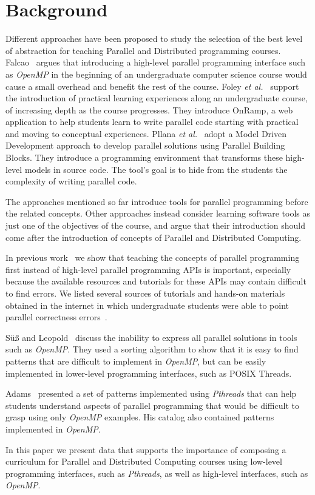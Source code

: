 \section{Background}
\label{sec:background}

Different approaches have been proposed to study the selection of the best
level of abstraction for teaching Parallel and Distributed programming courses.
Falcao~\cite{6565518} argues that introducing a high-level parallel programming
interface such as \textit{OpenMP} in the beginning of an undergraduate computer
science course would cause a small overhead and benefit the rest of the course.
Foley \textit{et al.}~\cite{FOLEY2017138} support the introduction of practical
learning experiences along an undergraduate course, of increasing depth as the
course progresses. They introduce OnRamp, a web application to help students
learn to write parallel code starting with practical and moving to conceptual
experiences.  Pllana \textit{et al.}~\cite{Pllana:2009} adopt a Model Driven
Development approach to develop parallel solutions using Parallel Building
Blocks. They introduce a programming environment that transforms these
high-level models in source code. The tool's goal is to hide from the students
the complexity of writing parallel code.

The approaches mentioned so far introduce tools for parallel programming before
the related concepts.  Other approaches instead consider learning software
tools as just one of the objectives of the course, and argue that their
introduction should come after the introduction of concepts of Parallel and
Distributed Computing.

In previous work~\cite{goncalves:OpenMPNotEasy} we show that teaching the
concepts of parallel programming first instead of high-level parallel
programming APIs is important, especially because the available resources and
tutorials for these APIs may contain difficult to find errors.  We listed
several sources of tutorials and hands-on materials obtained in the internet in
which undergraduate students were able to point parallel correctness
errors~\cite{SuB:2005:CMO:1892830.1892863}.

Sü\ss{} and Leopold~\cite{Leopold:userOpenMP} discuss the inability to express
all parallel solutions in tools such as \textit{OpenMP}. They used a sorting
algorithm to show that it is easy to find patterns that are difficult to
implement in \textit{OpenMP}, but can be easily implemented in lower-level
programming interfaces, such as POSIX Threads.

Adams~\cite{ADAMS201731} presented a set of patterns implemented using
\textit{Pthreads} that can help students understand aspects of parallel
programming that would be difficult to grasp using only \textit{OpenMP}
examples. His catalog also contained patterns implemented in \textit{OpenMP}.

In this paper we present data that supports the importance of composing a
curriculum for Parallel and Distributed Computing courses using low-level
programming interfaces, such as \textit{Pthreads}, as well as high-level
interfaces, such as \textit{OpenMP}.
